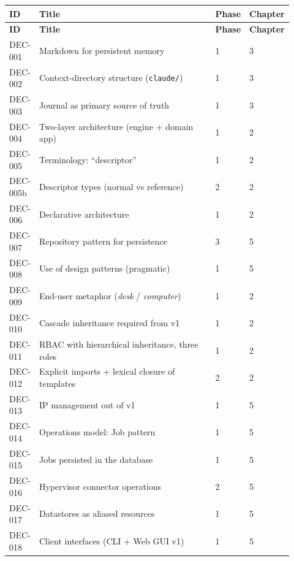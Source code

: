 \begin{longtable}{p{0.10\linewidth} p{0.62\linewidth} p{0.10\linewidth} p{0.10\linewidth}}
  \toprule
  \textbf{ID} & \textbf{Title} & \textbf{Phase} & \textbf{Chapter} \\
  \midrule
  \endfirsthead
  \toprule
  \textbf{ID} & \textbf{Title} & \textbf{Phase} & \textbf{Chapter} \\
  \midrule
  \endhead
  DEC-001  & Markdown for persistent memory                       & 1 & 3 \\
  DEC-002  & Context-directory structure (\texttt{claude/})       & 1 & 3 \\
  DEC-003  & Journal as primary source of truth                   & 1 & 3 \\
  DEC-004  & Two-layer architecture (engine + domain app)         & 1 & 2 \\
  DEC-005  & Terminology: ``descriptor''                          & 1 & 2 \\
  DEC-005b & Descriptor types (normal vs reference)               & 2 & 2 \\
  DEC-006  & Declarative architecture                             & 1 & 2 \\
  DEC-007  & Repository pattern for persistence                   & 3 & 5 \\
  DEC-008  & Use of design patterns (pragmatic)                   & 1 & 5 \\
  DEC-009  & End-user metaphor (\emph{desk} / \emph{computer})    & 1 & 2 \\
  DEC-010  & Cascade inheritance required from v1                 & 1 & 2 \\
  DEC-011  & RBAC with hierarchical inheritance, three roles      & 1 & 2 \\
  DEC-012  & Explicit imports + lexical closure of templates      & 2 & 2 \\
  DEC-013  & IP management out of v1                              & 1 & 5 \\
  DEC-014  & Operations model: Job pattern                        & 1 & 5 \\
  DEC-015  & Jobs persisted in the database                       & 1 & 5 \\
  DEC-016  & Hypervisor connector operations                      & 2 & 5 \\
  DEC-017  & Datastores as aliased resources                      & 1 & 5 \\
  DEC-018  & Client interfaces (CLI + Web GUI v1)                 & 1 & 5 \\

\end{longtable}
